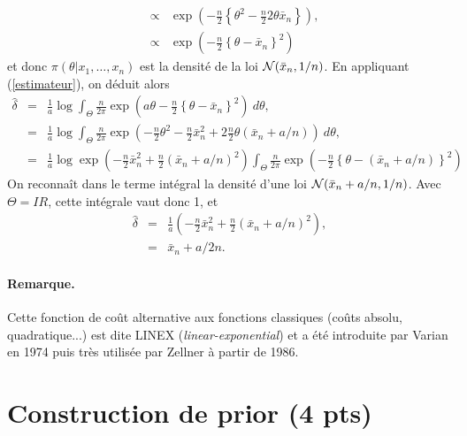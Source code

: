 \documentclass[10pt]{article}
\newcommand{\R}{I\!\!R}
\newcommand{\1}{\mathbbm{1}}
\begin{document}
\begin{enumerate}
\begin{eqnarray*}
 & \propto & \exp\left(- \frac{n}{2}\left\{\theta^2 - \frac{n}{2} 2\theta \bar{x}_n\right\} \right), \\
 & \propto &  \exp\left(- \frac{n}{2}\left\{\theta - \bar{x}_n\right\}^2\right)
\end{eqnarray*}
et donc $\pi(\theta|x_1,\ldots,x_n)$ est la densit\'e de la loi ${\cal{N}}(\bar{x}_n,1/n)$. En appliquant (\ref{estimateur}), on d\'eduit alors 
\begin{eqnarray*}
\hat{\delta} & = & \frac{1}{a}\log  \int_{\Theta} \frac{n}{2\pi} \exp\left(a\theta -  \frac{n}{2}\left\{\theta - \bar{x}_n\right\}^2\right) \ d\theta, \\
 & = & \frac{1}{a}\log  \int_{\Theta} \frac{n}{2\pi} \exp\left(-\frac{n}{2}\theta^2 -  \frac{n}{2}\bar{x}^2_n + 2 \frac{n}{2}\theta (\bar{x}_n + a/n) \right) \ d\theta, \\
 & = & \frac{1}{a}\log  \exp\left (-  \frac{n}{2}\bar{x}^2_n + \frac{n}{2}(\bar{x}_n + a/n)^2\right)\int_{\Theta} \frac{n}{2\pi}  \exp\left(-\frac{n}{2} \left\{\theta - (\bar{x}_n + a/n)\right\}^2\right) 
\end{eqnarray*}
On reconna\^it dans le terme int\'egral la densit\'e d'une loi ${\cal{N}}(\bar{x}_n + a/n,1/n)$. Avec $\Theta=\R$, cette int\'egrale vaut donc 1, et 
\begin{eqnarray*}
\hat{\delta} & = & \frac{1}{a} \left (-  \frac{n}{2}\bar{x}^2_n + \frac{n}{2}(\bar{x}_n + a/n)^2\right), \\
& = & \bar{x}_n + a/2n.  
\end{eqnarray*}

\end{enumerate}

\paragraph{Remarque.} Cette fonction de co\^ut alternative aux fonctions classiques (co\^uts absolu, quadratique...) est dite LINEX ({\it linear-exponential}) et a \'et\'e introduite par Varian en 1974 puis tr\`es utilis\'ee par Zellner \`a partir de 1986.  


\section{Construction de prior (4 pts)}
\end{document}
